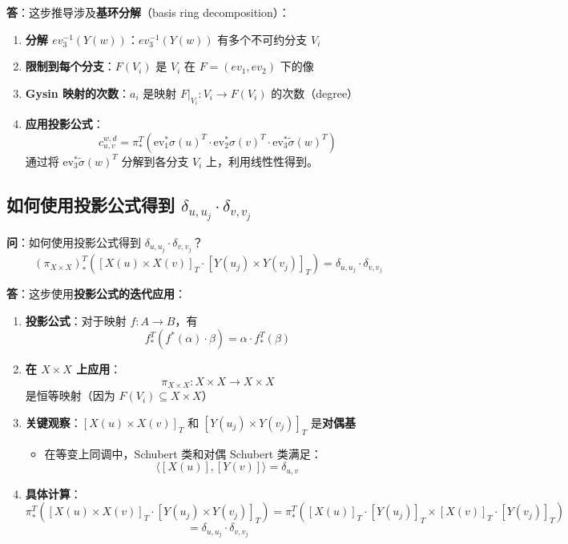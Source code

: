 \textbf{答}：这步推导涉及\textbf{基环分解}（basis ring decomposition）：

\begin{enumerate}
\item \textbf{分解 $ev_3^{-1}(Y(w))$}：$ev_3^{-1}(Y(w))$ 有多个不可约分支 $V_i$
\item \textbf{限制到每个分支}：$F(V_i)$ 是 $V_i$ 在 $F = (ev_1, ev_2)$ 下的像
\item \textbf{Gysin 映射的次数}：$a_i$ 是映射 $F|_{V_i}: V_i \to F(V_i)$ 的次数（degree）
\item \textbf{应用投影公式}：
$$c_{u, v}^{w, d} = \pi_*^T(\text{ev}_1^*\sigma(u)^T \cdot \text{ev}_2^*\sigma(v)^T \cdot \text{ev}_3^*\widetilde{\sigma}(w)^T)$$
通过将 $\text{ev}_3^*\widetilde{\sigma}(w)^T$ 分解到各分支 $V_i$ 上，利用线性性得到。
\end{enumerate}

\subsection{如何使用投影公式得到 $\delta_{u,u_j} \cdot \delta_{v,v_j}$}\label{sec:qa-projection-formula-delta}
\textbf{问}：如何使用投影公式得到 $\delta_{u,u_j} \cdot \delta_{v,v_j}$？
$$\left(\pi_{X \times X}\right)_*^T\left([X(u) \times X(v)]_T \cdot\left[Y\left(u_j\right) \times Y\left(v_j\right)\right]_T\right)=\delta_{u, u_j} \cdot \delta_{v, v_j}$$

\textbf{答}：这步使用\textbf{投影公式的迭代应用}：

\begin{enumerate}
\item \textbf{投影公式}：对于映射 $f: A \to B$，有
$$f_*^T(f^*(\alpha) \cdot \beta) = \alpha \cdot f_*^T(\beta)$$
\item \textbf{在 $X \times X$ 上应用}：
$$\pi_{X \times X}: X \times X \to X \times X$$ 是恒等映射（因为 $F(V_i) \subseteq X \times X$）
\item \textbf{关键观察}：$[X(u) \times X(v)]_T$ 和 $[Y(u_j) \times Y(v_j)]_T$ 是\textbf{对偶基}
\begin{itemize}
\item 在等变上同调中，Schubert 类和对偶 Schubert 类满足：$$\langle [X(u)], [Y(v)] \rangle = \delta_{u,v}$$
\end{itemize}
\item \textbf{具体计算}：
$$\pi_*^T([X(u) \times X(v)]_T \cdot [Y(u_j) \times Y(v_j)]_T) = \pi_*^T([X(u)]_T \cdot [Y(u_j)]_T \times [X(v)]_T \cdot [Y(v_j)]_T)$$
$$= \delta_{u,u_j} \cdot \delta_{v,v_j}$$
\end{enumerate}

